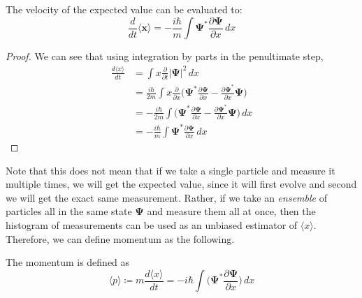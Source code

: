 \documentclass{article}
\begin{document}
    \begin{theorem}
      \label{thm:ehrenfests-theorem-for-velocity}
 
      The velocity of the expected value can be evaluated to: 
      \begin{equation} 
        \frac{d}{dt} \langle \mathbf{x} \rangle = -\frac{i \hbar}{m} \int \boldsymbol{\Psi}^\ast \frac{\partial \boldsymbol{\Psi}}{\partial x} \,dx
      \end{equation}
    \end{theorem}
    \begin{proof} 
      We can see that using integration by parts in the penultimate step, 
      \begin{align} 
        \frac{d \langle x \rangle}{dt} & = \int x \frac{\partial}{\partial t} |\boldsymbol{\Psi}|^2 \,dx \\
                                       & = \frac{i \hbar}{2m} \int x \frac{\partial}{\partial x} \bigg( \boldsymbol{\Psi}^\ast \frac{\partial \boldsymbol{\Psi}}{\partial x} - \frac{\partial \boldsymbol{\Psi}^\ast}{\partial x} \boldsymbol{\Psi} \bigg) \\
                                       & = - \frac{i \hbar}{2m} \int \bigg( \boldsymbol{\Psi}^\ast \frac{\partial \boldsymbol{\Psi}}{\partial x} - \frac{\partial \boldsymbol{\Psi}^\ast}{\partial x} \boldsymbol{\Psi} \bigg) \,dx \\
                                       & = -\frac{i \hbar}{m} \int \boldsymbol{\Psi}^\ast \frac{\partial \boldsymbol{\Psi}}{\partial x} \,dx
      \end{align}
    \end{proof}

    Note that this does not mean that if we take a single particle and measure it multiple times, we will get the expected value, since it will first evolve and second we will get the exact same measurement. Rather, if we take an \textit{ensemble} of particles all in the same state $\mathbf{\Psi}$ and measure them all at once, then the histogram of measurements can be used as an unbiased estimator of $\langle x \rangle$. Therefore, we can define momentum as the following. 

    \begin{definition}[Momentum]
      \label{def:momentum}
      The momentum is defined as 
      \begin{equation} 
        \langle p \rangle \coloneqq m \frac{d \langle x \rangle}{dt} = - i\hbar \int \bigg( \boldsymbol{\Psi}^\ast \frac{\partial \boldsymbol{\Psi}}{\partial x} \bigg)  \,dx
      \end{equation}
    \end{definition}
\end{document}
